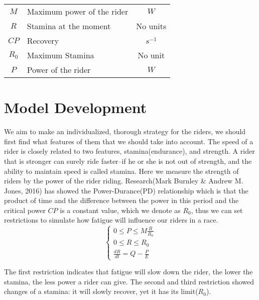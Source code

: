 \documentclass[12pt]{article}
\begin{document}
\begin{center}
{\begin{tabular}{clc}
            $M$           & Maximum  power of the rider                             & \quad $W$         \\[0.25cm]
            $R$           & Stamina at the moment                                   & \quad No units    \\[0.25cm]
            $CP$          & Recovery                                                & \quad $s^{-1}$    \\[0.25cm]
            $R_0$         & Maximum Stamina                                         & \quad No unit     \\[0.25cm]
            $P$           & Power of the rider                                      & \quad $W$         \\[0.25cm]
        \end{tabular}
    }
\end{center}
\section{Model Development}
We aim to make an individualized, thorough strategy for the riders, we should first find what features of them that we should take into account. 
The speed of a rider 
is closely related to two features, stamina(endurance), and strength. A rider that is stronger can surely ride faster--if he or she is not out of strength, and the ability 
to maintain speed is called stamina.
Here we measure the strength of riders by the power of the rider riding. Research(Mark Burnley \& Andrew M. Jones, 2016)\cite{doi:10.1080/17461391.2016.1249524} has showed the Power-Durance(PD) relationship 
which is that the product of time and the difference between the power in this period and the critical power $CP$ is a constant value, which we
denote as $R_0$,  thus we can  set restrictions  to simulate how fatigue will influence our riders in a race.
\begin{equation}
    \left\{
    \begin{array}{c}
        0                \leqslant  P  \leqslant  M\frac{R}{R_0} \\
        0                \leqslant  R  \leqslant  R_0            \\
        \frac{d R}{d t}  =          Q  -          \frac{P}{E}
    \end{array}
    \right.
\end{equation}

The first restriction indicates that fatigue will slow down the rider, the lower the stamina, the less power a rider can give. The second and third restriction 
showed changes of a stamina: it will slowly recover, yet it has its limit($R_0$).
\end{document}
